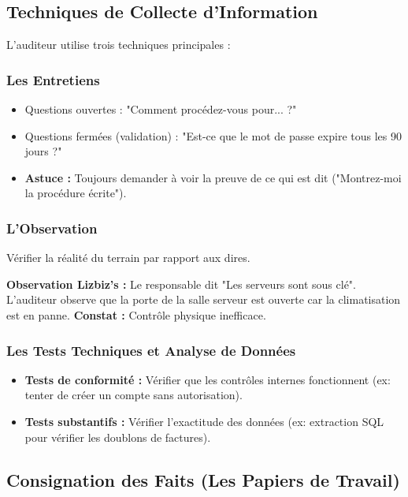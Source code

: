 \subsection{Techniques de Collecte d'Information}

L'auditeur utilise trois techniques principales :

\subsubsection{Les Entretiens}
\begin{itemize}
    \item Questions ouvertes : "Comment procédez-vous pour... ?"
    \item Questions fermées (validation) : "Est-ce que le mot de passe expire tous les 90 jours ?"
    \item \textbf{Astuce :} Toujours demander à voir la preuve de ce qui est dit ("Montrez-moi la procédure écrite").
\end{itemize}

\subsubsection{L'Observation}
Vérifier la réalité du terrain par rapport aux dires.
\begin{boxlizbiz}
\textbf{Observation Lizbiz's :}
Le responsable dit "Les serveurs sont sous clé". L'auditeur observe que la porte de la salle serveur est ouverte car la climatisation est en panne. \textbf{Constat :} Contrôle physique inefficace.
\end{boxlizbiz}

\subsubsection{Les Tests Techniques et Analyse de Données}
\begin{itemize}
    \item \textbf{Tests de conformité :} Vérifier que les contrôles internes fonctionnent (ex: tenter de créer un compte sans autorisation).
    \item \textbf{Tests substantifs :} Vérifier l'exactitude des données (ex: extraction SQL pour vérifier les doublons de factures).
\end{itemize}

\subsection{Consignation des Faits (Les Papiers de Travail)}

